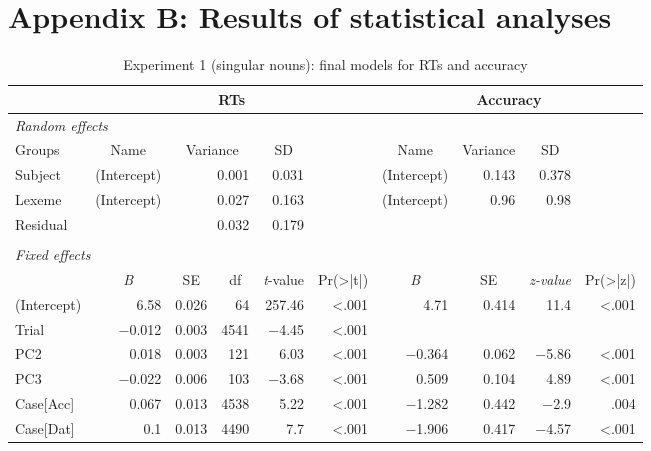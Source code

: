 \documentclass[output=paper, modfonts,newtxmath,hidelinks]{langscibook}
\begin{document}
\section*{Appendix B: Results of statistical analyses}
\begin{sidewaystable}
	\caption{Experiment 1 (singular nouns): final models for RTs and accuracy}
	\label{tab:LMERsg}
	\begin{tabular}{l*{9}r} 
  	\lsptoprule
    ~			& \multicolumn{5}{c}{RTs} & \multicolumn{4}{c}{Accuracy}\\
    \midrule
    \multicolumn{10}{l}{\textit{Random effects}}\\
    Groups & \multicolumn{1}{c}{Name}	&\multicolumn{2}{c}{Variance} &	\multicolumn{1}{c}{SD} &
    		 ~  & \multicolumn{1}{c}{Name}	& \multicolumn{1}{c}{Variance} & \multicolumn{1}{c}{SD}\\
    Subject	&\multicolumn{1}{l}{(Intercept)}&\multicolumn{2}{r}{0.001}	&	0.031 &
    		 ~  & \multicolumn{1}{l}{(Intercept)}& 0.143	&	0.378\\
	Lexeme	&\multicolumn{1}{l}{(Intercept)}&\multicolumn{2}{r}{0.027}	&	0.163 &
			~  & \multicolumn{1}{l}{(Intercept)}& 0.96  &	0.98  \\
	Residual &\multicolumn{1}{l}{}	&\multicolumn{2}{r}{0.032}	&	0.179 &
   			 ~  & \multicolumn{4}{l}{}\\
    \\         
	\multicolumn{10}{l}{\textit{Fixed effects}}\\
   	   	~	&\multicolumn{1}{c}{\textit{B}} &	\multicolumn{1}{c}{SE} 	& \multicolumn{1}{c}{df} & \multicolumn{1}{c}{\textit{t}-value}	& \multicolumn{1}{c}{Pr(>|t|)}	&    \multicolumn{1}{c}{\textit{B}} &	\multicolumn{1}{c}{SE}		&    \multicolumn{1}{c}{ \textit{z-value}}	& \multicolumn{1}{c}{Pr(>|z|)} \\
    (Intercept)	&	6.58	&	0.026	& 64 &	257.46		& <.001	&
    				4.71	&	0.414	& 11.4	&	<.001\\
	Trial		&	$-$0.012	&	0.003	& 4541 &	$-$4.45	& <.001	&
    			\multicolumn{4}{l}{}\\
	PC2			&	0.018	&	0.003	& 121  &	6.03	& <.001   &
    				$-$0.364	&	0.062	&$-$5.86	& <.001\\
	PC3			&	$-$0.022	&	0.006	& 103  &	$-$3.68	& <.001	&
					0.509	&	0.104	&4.89	&<.001\\	
	Case[Acc]	&	0.067	&	0.013	& 4538 &	5.22	& <.001	&
    				$-$1.282	&	0.442	&$-$2.9	&.004\\
	Case[Dat]	&	0.1		&	0.013	& 4490 &	7.7		& <.001	&
					$-$1.906	&	0.417	&$-$4.57	&<.001\\

\end{tabular}
\end{sidewaystable}
\end{document}
